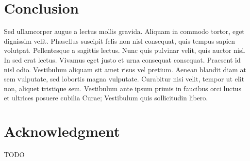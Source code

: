 \documentclass[10pt, conference]{IEEEtran}
\begin{document}
\section{Conclusion}
\label{sec:conclusion}

Sed ullamcorper augue a lectus mollis gravida. Aliquam in commodo tortor, eget dignissim velit. Phasellus suscipit felis non nisl consequat, quis tempus sapien volutpat. Pellentesque a sagittis lectus. Nunc quis pulvinar velit, quis auctor nisl. In sed erat lectus. Vivamus eget justo et urna consequat consequat. Praesent id nisl odio. Vestibulum aliquam sit amet risus vel pretium. Aenean blandit diam at sem vulputate, sed lobortis magna vulputate. Curabitur nisi velit, tempor ut elit non, aliquet tristique sem. Vestibulum ante ipsum primis in faucibus orci luctus et ultrices posuere cubilia Curae; Vestibulum quis sollicitudin libero.

\section*{Acknowledgment}
TODO

\balance


\end{document}
